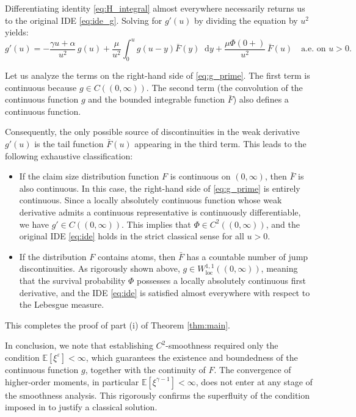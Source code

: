 \documentclass[smallextended]{svjour3}
\providecommand{\diff}{\mathop{}\!\mathrm{d}}
\begin{document}
Differentiating identity \eqref{eq:H_integral} almost everywhere necessarily returns us to the original IDE \eqref{eq:ide_g}. Solving for $g'(u)$ by dividing the equation by $u^2$ yields:
\begin{equation}\label{eq:g_prime}
g'(u) = -\frac{\gamma u + \alpha}{u^2}\, g(u) + \frac{\mu}{u^2}\int_0^u g(u-y)\bar{F}(y)\diff y + \frac{\mu \Phi(0+)}{u^2}\,\bar{F}(u) \quad \text{a.e. on } u>0.
\end{equation}

Let us analyze the terms on the right-hand side of \eqref{eq:g_prime}. The first term is continuous because $g \in C((0,\infty))$. The second term (the convolution of the continuous function $g$ and the bounded integrable function $\bar{F}$) also defines a continuous function. 

Consequently, the only possible source of discontinuities in the weak derivative $g'(u)$ is the tail function $\bar{F}(u)$ appearing in the third term. This leads to the following exhaustive classification:
\begin{itemize}
    \item If the claim size distribution function $F$ is continuous on $(0,\infty)$, then $\bar{F}$ is also continuous. In this case, the right-hand side of \eqref{eq:g_prime} is entirely continuous. Since a locally absolutely continuous function whose weak derivative admits a continuous representative is continuously differentiable, we have $g' \in C((0,\infty))$. This implies that $\Phi \in C^2((0,\infty))$, and the original IDE \eqref{eq:ide} holds in the strict classical sense for all $u>0$.
    \item If the distribution $F$ contains atoms, then $\bar{F}$ has a countable number of jump discontinuities. As rigorously shown above, $g \in W^{1,1}_{\text{loc}}((0,\infty))$, meaning that the survival probability $\Phi$ possesses a locally absolutely continuous first derivative, and the IDE \eqref{eq:ide} is satisfied almost everywhere with respect to the Lebesgue measure.
\end{itemize}

This completes the proof of part (i) of Theorem \ref{thm:main}.

In conclusion, we note that establishing $C^2$-smoothness required only the condition $\mathbb{E}[\xi^\varepsilon] < \infty$, which guarantees the existence and boundedness of the continuous function $g$, together with the continuity of $F$. The convergence of higher-order moments, in particular $\mathbb{E}[\xi^{\gamma-1}] < \infty$, does not enter at any stage of the smoothness analysis. This rigorously confirms the superfluity of the condition imposed in \cite{AK2026} to justify a classical solution.
\end{document}
